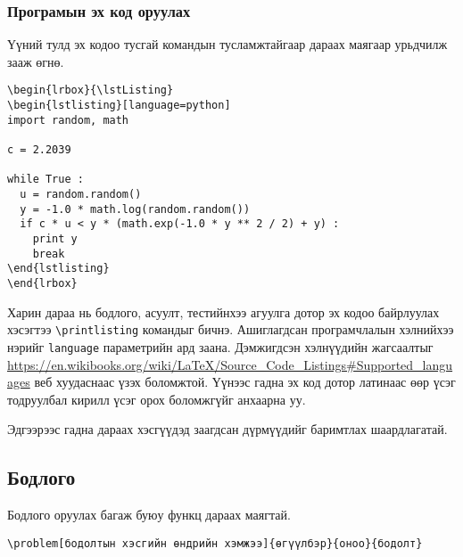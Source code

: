 \documentclass[10pt]{article}
\theoremstyle{definition}
\begin{document}
\subsubsection{Програмын эх код оруулах} Үүний тулд эх кодоо тусгай командын тусламжтайгаар дараах маягаар урьдчилж зааж өгнө.
\begin{verbatim}
\begin{lrbox}{\lstListing}
\begin{lstlisting}[language=python]
import random, math

c = 2.2039

while True :
  u = random.random()
  y = -1.0 * math.log(random.random())
  if c * u < y * (math.exp(-1.0 * y ** 2 / 2) + y) :
    print y
    break
\end{lstlisting}
\end{lrbox}
\end{verbatim}
Харин дараа нь бодлого, асуулт, тестийнхээ агуулга дотор эх кодоо байрлуулах хэсэгтээ \verb|\printlisting| командыг бичнэ. Ашиглагдсан програмчлалын хэлнийхээ нэрийг \texttt{language} параметрийн ард заана. Дэмжигдсэн хэлнүүдийн жагсаалтыг \url{https://en.wikibooks.org/wiki/LaTeX/Source_Code_Listings#Supported_languages} веб хуудаснаас үзэх боломжтой. Үүнээс гадна эх код дотор латинаас өөр үсэг тодруулбал кирилл үсэг орох боломжгүйг анхаарна уу.

\vspace{\baselineskip}

\par\noindent Эдгээрээс гадна дараах хэсгүүдэд заагдсан дүрмүүдийг баримтлах шаардлагатай.

\subsection{Бодлого}

Бодлого оруулах багаж буюу функц дараах маягтай.
\begin{verbatim}
\problem[бодолтын хэсгийн өндрийн хэмжээ]{өгүүлбэр}{оноо}{бодолт}
\end{verbatim}
\end{document}
